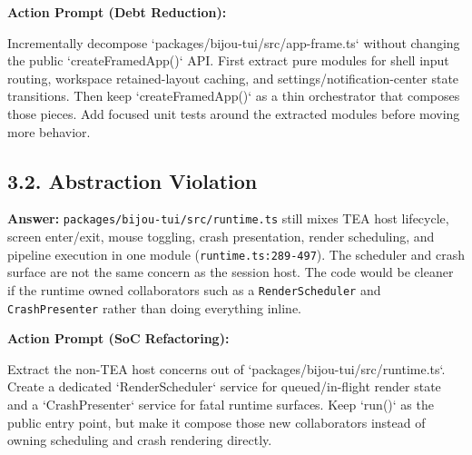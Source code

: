 \textbf{Action Prompt (Debt Reduction):}

\begin{CodeBlock}
Incrementally decompose `packages/bijou-tui/src/app-frame.ts` without changing the public `createFramedApp()` API. First extract pure modules for shell input routing, workspace retained-layout caching, and settings/notification-center state transitions. Then keep `createFramedApp()` as a thin orchestrator that composes those pieces. Add focused unit tests around the extracted modules before moving more behavior.
\end{CodeBlock}

\subsection{3.2. Abstraction Violation}\label{record-416-abstraction-violation}

\textbf{Answer:} \texttt{p\allowbreak{}a\allowbreak{}c\allowbreak{}k\allowbreak{}a\allowbreak{}g\allowbreak{}e\allowbreak{}s\allowbreak{}/\allowbreak{}b\allowbreak{}i\allowbreak{}j\allowbreak{}o\allowbreak{}u\allowbreak{}-\allowbreak{}t\allowbreak{}u\allowbreak{}i\allowbreak{}/\allowbreak{}s\allowbreak{}r\allowbreak{}c\allowbreak{}/\allowbreak{}r\allowbreak{}u\allowbreak{}n\allowbreak{}t\allowbreak{}i\allowbreak{}m\allowbreak{}e\allowbreak{}.\allowbreak{}t\allowbreak{}s} still mixes TEA host lifecycle, screen enter/exit, mouse toggling, crash presentation, render scheduling, and pipeline execution in one module (\texttt{r\allowbreak{}u\allowbreak{}n\allowbreak{}t\allowbreak{}i\allowbreak{}m\allowbreak{}e\allowbreak{}.\allowbreak{}t\allowbreak{}s\allowbreak{}:\allowbreak{}2\allowbreak{}8\allowbreak{}9\allowbreak{}-\allowbreak{}4\allowbreak{}9\allowbreak{}7}). The scheduler and crash surface are not the same concern as the session host. The code would be cleaner if the runtime owned collaborators such as a \texttt{R\allowbreak{}e\allowbreak{}n\allowbreak{}d\allowbreak{}e\allowbreak{}r\allowbreak{}S\allowbreak{}c\allowbreak{}h\allowbreak{}e\allowbreak{}d\allowbreak{}u\allowbreak{}l\allowbreak{}e\allowbreak{}r} and \texttt{C\allowbreak{}r\allowbreak{}a\allowbreak{}s\allowbreak{}h\allowbreak{}P\allowbreak{}r\allowbreak{}e\allowbreak{}s\allowbreak{}e\allowbreak{}n\allowbreak{}t\allowbreak{}e\allowbreak{}r} rather than doing everything inline.

\textbf{Action Prompt (SoC Refactoring):}

\begin{CodeBlock}
Extract the non-TEA host concerns out of `packages/bijou-tui/src/runtime.ts`. Create a dedicated `RenderScheduler` service for queued/in-flight render state and a `CrashPresenter` service for fatal runtime surfaces. Keep `run()` as the public entry point, but make it compose those new collaborators instead of owning scheduling and crash rendering directly.
\end{CodeBlock}

